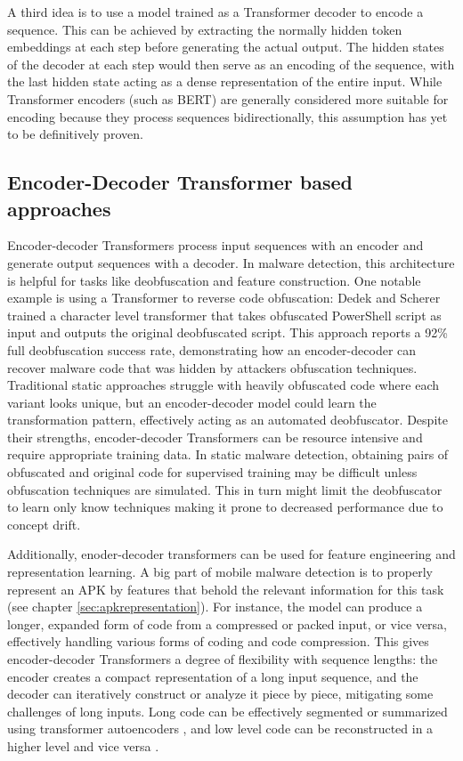 A third idea is to use a model trained as a Transformer decoder to encode a sequence.
This can be achieved by extracting the normally hidden token embeddings at each step before generating the actual output.
The hidden states of the decoder at each step would then serve as an encoding of the sequence, 
with the last hidden state acting as a dense representation of the entire input.
While Transformer encoders (such as BERT) are generally considered more suitable 
for encoding because they process sequences bidirectionally, this assumption has yet to be definitively proven.

\subsection{Encoder-Decoder Transformer based approaches}

Encoder-decoder Transformers process input sequences with an encoder and generate output 
sequences with a decoder. 
In malware detection, this architecture is helpful for tasks like deobfuscation and 
feature construction. 
One notable example is using a Transformer to reverse code obfuscation: 
Dedek and Scherer \cite{tbased_deobfuscation} trained a character level transformer 
that takes obfuscated PowerShell 
script as input and outputs the original deobfuscated script. 
This approach reports a 92\% full deobfuscation success rate, 
demonstrating how an encoder-decoder can recover malware code that was hidden by attackers obfuscation 
techniques. 
Traditional static approaches struggle with heavily obfuscated code where each variant looks unique, 
but an encoder-decoder model could learn the transformation pattern, 
effectively acting as an automated deobfuscator. 
Despite their strengths, encoder-decoder Transformers can be resource 
intensive and require appropriate training data. In static malware detection, obtaining pairs of 
obfuscated and original code for supervised training may be difficult unless obfuscation techniques 
are simulated. This in turn might limit the deobfuscator to learn only know techniques making it prone to
decreased performance due to concept drift. 

Additionally, enoder-decoder transformers can be used for feature engineering and representation learning.
A big part of mobile malware detection is to properly represent an APK by features that behold 
the relevant information for this task (see chapter \ref{sec:apkrepresentation}).
For instance, the model can produce a longer, expanded form of code from a compressed or packed input, 
or vice versa, effectively handling various forms of coding and code compression. 
This gives encoder-decoder Transformers a degree of flexibility with sequence lengths: 
the encoder creates a compact representation of a long input sequence, and the decoder can iteratively 
construct or analyze it piece by piece, mitigating some challenges of long inputs.
Long code can be effectively segmented or summarized using transformer autoencoders \cite{tbased_codesum}, 
and low level code can be reconstructed in a higher level and 
vice versa \cite{tbased_codetran}.

